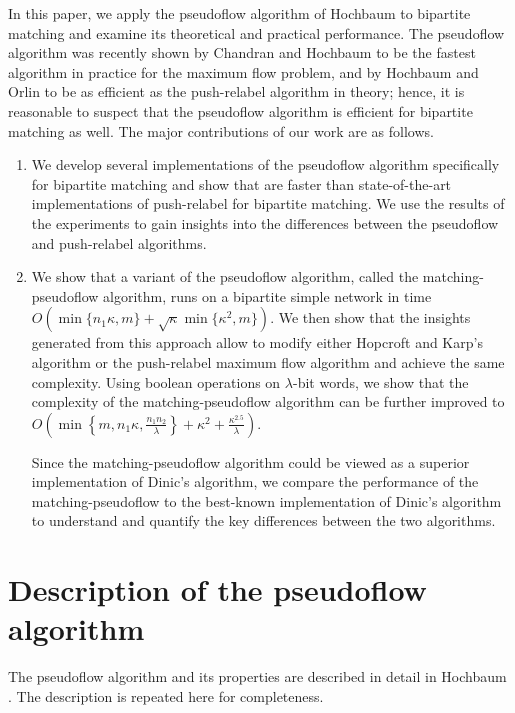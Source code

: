 \documentclass{article}
\newcounter{contribution}
\begin{document}
In this paper, we apply the pseudoflow algorithm of Hochbaum \cite{Hoc97, Hoc07} to bipartite matching and examine its theoretical and practical performance.  The pseudoflow algorithm was recently shown by Chandran and Hochbaum \cite{ChaH07} to be the fastest algorithm in practice for the maximum flow problem, and by Hochbaum and Orlin to be as efficient as the push-relabel algorithm in theory; hence, it is reasonable to suspect that the pseudoflow algorithm is efficient for bipartite matching as well.  The major contributions of our work are as follows.
\begin{enumerate}
\item We develop several implementations of the pseudoflow algorithm specifically for bipartite matching and show that are faster than state-of-the-art implementations of push-relabel for bipartite matching.  We use the results of the experiments to gain insights into the differences between the pseudoflow and push-relabel algorithms. 
\item We show that a variant of the pseudoflow algorithm, called the {\sf matching-pseudoflow} algorithm, runs on a bipartite simple network in time $O(\min\{n_1\kappa, m\}+\sqrt{\kappa}\min\{\kappa^2, m\})$. We then show that the insights generated from this approach allow to modify either Hopcroft and Karp's algorithm or the push-relabel maximum flow algorithm and achieve the same complexity.  Using boolean operations on $\lambda$-bit words, we show that the complexity of the {\sf matching-pseudoflow} algorithm can be further improved to $O\left (\min \left \{ m,n_1\kappa, \frac{n_1n_2}{\lambda} \right \} + \kappa^2 +\frac{\kappa^{2.5}} {\lambda}\right )$.

Since the {\sf matching-pseudoflow} algorithm could be viewed as a superior implementation of Dinic's algorithm, we compare the performance of the {\sf matching-pseudoflow} to the best-known implementation of Dinic's algorithm to understand and quantify the key differences between the two algorithms. 
\end{enumerate}

\section{Description of the pseudoflow algorithm}
\label{sec:pseudoflow}

The pseudoflow algorithm and its properties are described in detail in
Hochbaum \cite{Hoc07}.  The description is repeated here for
completeness.
\end{document}
